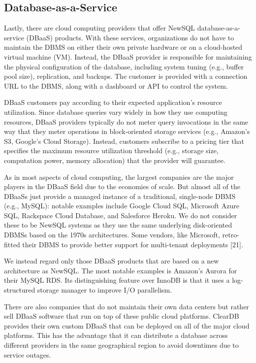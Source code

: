 \documentclass[a4paper,12pt,notitlepage,twoside,openright]{article}
\begin{document}
\hypertarget{database-as-a-service}{%
\subsection{Database-as-a-Service}\label{database-as-a-service}}

Lastly, there are cloud computing providers that offer NewSQL
database-as-a-service (DBaaS) products. With these services,
organizations do not have to maintain the DBMS on either their own
private hardware or on a cloud-hosted virtual machine (VM). Instead, the
DBaaS provider is responsible for maintaining the physical configuration
of the database, including system tuning (e.g., buffer pool size),
replication, and backups. The customer is provided with a connection URL
to the DBMS, along with a dashboard or API to control the system.

DBaaS customers pay according to their expected application's resource
utilization. Since database queries vary widely in how they use
computing resources, DBaaS providers typically do not meter query
invocations in the same way that they meter operations in block-oriented
storage services (e.g., Amazon's S3, Google's Cloud Storage). Instead,
customers subscribe to a pricing tier that specifies the maximum
resource utilization threshold (e.g., storage size, computation power,
memory allocation) that the provider will guarantee.

As in most aspects of cloud computing, the largest companies are the
major players in the DBaaS field due to the economies of scale. But
almost all of the DBaaSs just provide a managed instance of a
traditional, single-node DBMS (e.g., MySQL): notable examples include
Google Cloud SQL, Microsoft Azure SQL, Rackspace Cloud Database, and
Salesforce Heroku. We do not consider these to be NewSQL systems as they
use the same underlying disk-oriented DBMSs based on the 1970s
architectures. Some vendors, like Microsoft, retro-fitted their DBMS to
provide better support for multi-tenant deployments {[}21{]}.

We instead regard only those DBaaS products that are based on a new
architecture as NewSQL. The most notable examples is Amazon's Aurora for
their MySQL RDS. Its distinguishing feature over InnoDB is that it uses
a log-structured storage manager to improve I/O parallelism.

There are also companies that do not maintain their own data centers but
rather sell DBaaS software that run on top of these public cloud
platforms. ClearDB provides their own custom DBaaS that can be deployed
on all of the major cloud platforms. This has the advantage that it can
distribute a database across different providers in the same
geographical region to avoid downtimes due to service outages.
\end{document}
